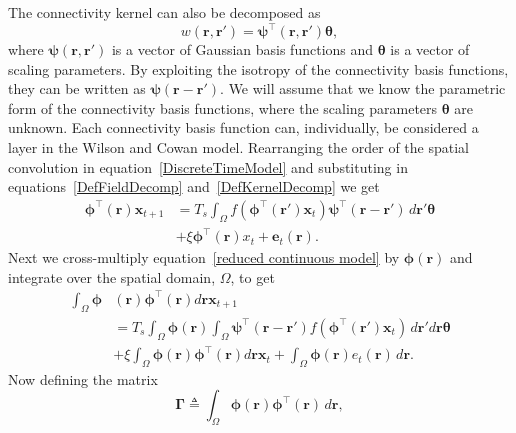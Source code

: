 \documentclass[5p,authoryear]{elsarticle}
\begin{document}
The connectivity kernel can also be decomposed as 
\begin{equation}\label{DefKernelDecomp}
	 w\left(\mathbf{r},\mathbf{r}'\right) =\boldsymbol{\psi}^\top\left(\mathbf{r},\mathbf{r}'\right) \boldsymbol{\theta},
\end{equation}
where $\boldsymbol{\psi}(\mathbf{r},\mathbf{r}')$ is a vector of Gaussian basis functions and $\boldsymbol{\theta}$ is a vector of scaling parameters. By exploiting the isotropy of the connectivity basis functions, they can be written as  
$\boldsymbol{\psi}(\mathbf{r}-\mathbf{r}')$. We will assume that we know the parametric form of the connectivity basis functions, where the scaling parameters $\boldsymbol{\theta}$ are unknown. Each connectivity basis function can, individually, be considered a layer in the Wilson and Cowan model. Rearranging the order of the spatial convolution in equation~\ref{DiscreteTimeModel} and substituting in equations~\ref{DefFieldDecomp} and~\ref{DefKernelDecomp} we get 
\begin{align}
	\label{reduced continuous model}
	\boldsymbol{\phi}^{\top}(\mathbf{r})\mathbf{x}_{t+1} &= T_s\int_\Omega{f(\boldsymbol{\phi}^{\top}(\mathbf{r}')\mathbf{x}_t )\boldsymbol{\psi}^{\top}(\mathbf{r}-\mathbf{r}') \, d\mathbf{r}'}\boldsymbol{\theta} \nonumber \\
	&+ \xi\boldsymbol{\phi}^{\top}(\mathbf{r})x_t + \mathbf{e}_t(\mathbf{r}). 
\end{align}
Next we cross-multiply equation~\ref{reduced continuous model} by $\boldsymbol{\phi}(\mathbf{r})$ and integrate over the spatial domain, $\Omega$, to get 
\begin{align}
	\label{StartofReduction}
 	\int_\Omega \boldsymbol{\phi} &\left(\mathbf{r}\right)\boldsymbol{\phi}^{\top}\left(\mathbf{r}\right)d\mathbf{r} \mathbf{x}_{t+1}  \nonumber \\
 &=T_s \int_\Omega \boldsymbol{\phi} (\mathbf{r}) \int_\Omega \boldsymbol{\psi}^{\top} (\mathbf{r}-\mathbf{r}') 
 f(\boldsymbol{\phi}^{\top}(\mathbf{r}') \mathbf{x}_t ) \, d\mathbf{r}'d\mathbf{r}\boldsymbol{\theta} \nonumber \\ 
&+ \xi\int_\Omega {\boldsymbol{\phi}(\mathbf{r})\boldsymbol{\phi}^{\top}(\mathbf{r})d\mathbf{r}} \mathbf{x}_t + 
\int_\Omega{\boldsymbol{\phi} (\mathbf{r}) e_t(\mathbf{r}) \, d\mathbf{r}}. 
\end{align}
Now defining the matrix
\begin{equation}\label{eq:DefGamma}
	\boldsymbol{\Gamma} \triangleq \int_\Omega {\boldsymbol{\phi} \left(\mathbf{r}\right)\boldsymbol{\phi} ^{\top}\left(\mathbf{r}\right) \, d\mathbf{r}}, 
\end{equation}
\end{document}
